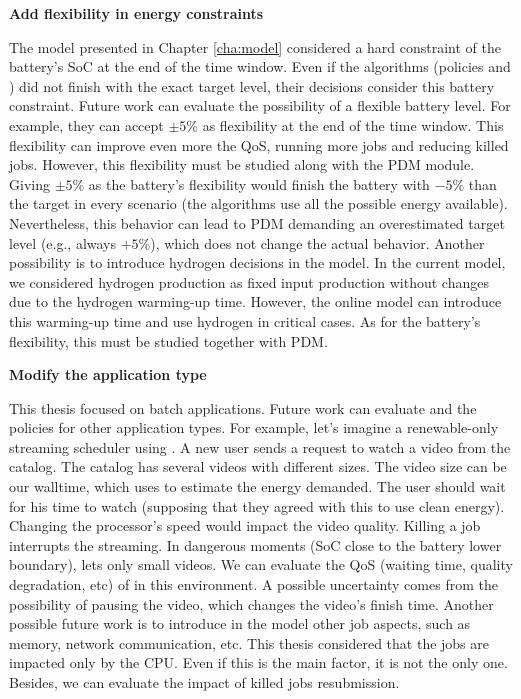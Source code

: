 \textbf{Add flexibility in energy constraints}

The model presented in Chapter \ref{cha:model} considered a hard constraint of the battery's SoC at the end of the time window. Even if the algorithms (policies and \emph{\systemName}) did not finish with the exact target level, their decisions consider this battery constraint. Future work can evaluate the possibility of a flexible battery level. For example, they can accept $\pm 5\%$ as flexibility at the end of the time window. This flexibility can improve even more the QoS, running more jobs and reducing killed jobs. However, this flexibility must be studied along with the PDM module. Giving $\pm 5\%$ as the battery's flexibility would finish the battery with $-5\%$ than the target in every scenario (the algorithms use all the possible energy available). Nevertheless, this behavior can lead to PDM demanding an overestimated target level (e.g., always $+5\%$), which does not change the actual behavior. Another possibility is to introduce hydrogen decisions in the model. In the current model, we considered hydrogen production as fixed input production without changes due to the hydrogen warming-up time. However, the online model can introduce this warming-up time and use hydrogen in critical cases. As for the battery's flexibility, this must be studied together with PDM.

\textbf{Modify the application type}

This thesis focused on batch applications. Future work can evaluate \emph{\systemName} and the policies for other application types. For example, let's imagine a renewable-only streaming scheduler using \emph{\systemName}. A new user sends a request to watch a video from the catalog. The catalog has several videos with different sizes. The video size can be our walltime, which \emph{\systemName} uses to estimate the energy demanded. The user should wait for his time to watch (supposing that they agreed with this to use clean energy). Changing the processor's speed would impact the video quality. Killing a job interrupts the streaming. In dangerous moments (SoC close to the battery lower boundary), \emph{\systemName} lets only small videos. We can evaluate the QoS (waiting time, quality degradation, etc) of \emph{\systemName} in this environment. A possible uncertainty comes from the possibility of pausing the video, which changes the video's finish time. Another possible future work is to introduce in the model other job aspects, such as memory, network communication, etc. This thesis considered that the jobs are impacted only by the CPU. Even if this is the main factor, it is not the only one. Besides, we can evaluate the impact of killed jobs resubmission.

